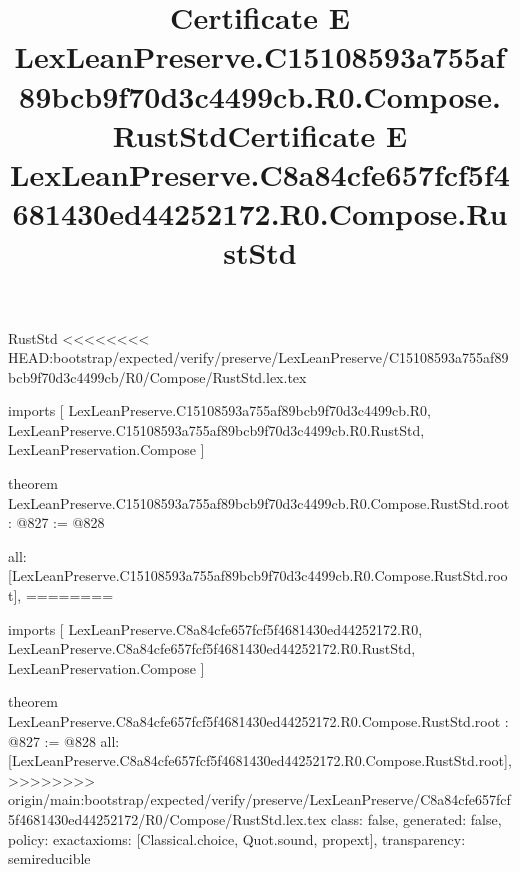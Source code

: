 \begin{lexlean}{RustStd}
<<<<<<<< HEAD:bootstrap/expected/verify/preserve/LexLeanPreserve/C15108593a755af89bcb9f70d3c4499cb/R0/Compose/RustStd.lex.tex
\title{Certificate E LexLeanPreserve.C15108593a755af89bcb9f70d3c4499cb.R0.Compose.RustStd}
\begin{coremodule}
imports [
  LexLeanPreserve.C15108593a755af89bcb9f70d3c4499cb.R0,
  LexLeanPreserve.C15108593a755af89bcb9f70d3c4499cb.R0.RustStd,
  LexLeanPreservation.Compose
]

theorem LexLeanPreserve.C15108593a755af89bcb9f70d3c4499cb.R0.Compose.RustStd.root : @827 := @828 {
  all: [LexLeanPreserve.C15108593a755af89bcb9f70d3c4499cb.R0.Compose.RustStd.root],
========
\title{Certificate E LexLeanPreserve.C8a84cfe657fcf5f4681430ed44252172.R0.Compose.RustStd}
\begin{coremodule}
imports [
  LexLeanPreserve.C8a84cfe657fcf5f4681430ed44252172.R0,
  LexLeanPreserve.C8a84cfe657fcf5f4681430ed44252172.R0.RustStd,
  LexLeanPreservation.Compose
]

theorem LexLeanPreserve.C8a84cfe657fcf5f4681430ed44252172.R0.Compose.RustStd.root : @827 := @828 {
  all: [LexLeanPreserve.C8a84cfe657fcf5f4681430ed44252172.R0.Compose.RustStd.root],
>>>>>>>> origin/main:bootstrap/expected/verify/preserve/LexLeanPreserve/C8a84cfe657fcf5f4681430ed44252172/R0/Compose/RustStd.lex.tex
  class: false,
  generated: false,
  policy: exact{axioms: [Classical.choice, Quot.sound, propext]},
  transparency: semireducible
}


\end{coremodule}}
\end{coremodule}
\end{lexlean}

